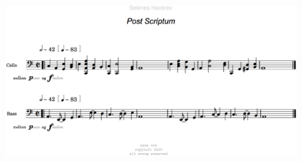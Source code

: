 \bigskip
\bigskip
\bigskip 

\begin{figure}[h!]
	\begin{center}
		\includegraphics[width=1\textwidth]{mp/img/img7}
		\label{ps}
	\end{center}
\end{figure}

